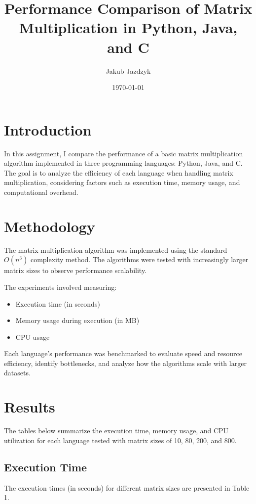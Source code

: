 \documentclass{article}
\title{Performance Comparison of Matrix Multiplication in Python, Java, and C}
\author{Jakub Jazdzyk}
\date{\today}
\begin{document}
\maketitle

\section{Introduction}

In this assignment, I compare the performance of a basic matrix multiplication algorithm implemented in three programming languages: Python, Java, and C. The goal is to analyze the efficiency of each language when handling matrix multiplication, considering factors such as execution time, memory usage, and computational overhead.

\section{Methodology}

The matrix multiplication algorithm was implemented using the standard \(O(n^3)\) complexity method. The algorithms were tested with increasingly larger matrix sizes to observe performance scalability.

The experiments involved measuring:

\begin{itemize}
    \item Execution time (in seconds)
    \item Memory usage during execution (in MB)
    \item CPU usage
\end{itemize}

Each language's performance was benchmarked to evaluate speed and resource efficiency, identify bottlenecks, and analyze how the algorithms scale with larger datasets.

\section{Results}

The tables below summarize the execution time, memory usage, and CPU utilization for each language tested with matrix sizes of 10, 80, 200, and 800.

\subsection{Execution Time}

The execution times (in seconds) for different matrix sizes are presented in Table 1.
\end{document}
